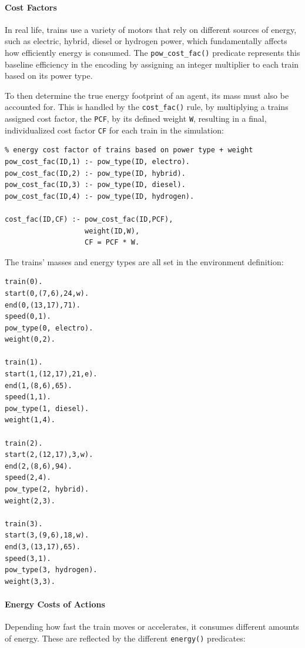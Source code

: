 \documentclass[12pt, a4paper]{llncs}
\begin{document}
\paragraph{Cost Factors}
In real life, trains use a variety of motors that rely on different sources of energy, such as electric, hybrid, diesel or hydrogen power, which fundamentally affects how efficiently energy is consumed. The \texttt{pow\_cost\_fac()} predicate represents this baseline efficiency in the encoding by assigning an integer multiplier to each train based on its power type.

To then determine the true energy footprint of an agent, its mass must also be accounted for. This is handled by the \texttt{cost\_fac()} rule, by multiplying a trains assigned cost factor, the \texttt{PCF}, by its defined weight \texttt{W}, resulting in a final, individualized cost factor \texttt{CF} for each train in the simulation:
\begin{verbatim}
% energy cost factor of trains based on power type + weight
pow_cost_fac(ID,1) :- pow_type(ID, electro).
pow_cost_fac(ID,2) :- pow_type(ID, hybrid).
pow_cost_fac(ID,3) :- pow_type(ID, diesel).
pow_cost_fac(ID,4) :- pow_type(ID, hydrogen).

cost_fac(ID,CF) :- pow_cost_fac(ID,PCF),
                   weight(ID,W),
                   CF = PCF * W.
\end{verbatim}

The trains' masses and  energy types are all set in the environment definition:
\begin{verbatim}
train(0).
start(0,(7,6),24,w).
end(0,(13,17),71).
speed(0,1).
pow_type(0, electro).
weight(0,2).

train(1).
start(1,(12,17),21,e).
end(1,(8,6),65).
speed(1,1).
pow_type(1, diesel).
weight(1,4).

train(2).
start(2,(12,17),3,w).
end(2,(8,6),94).
speed(2,4).
pow_type(2, hybrid).
weight(2,3).

train(3).
start(3,(9,6),18,w).
end(3,(13,17),65).
speed(3,1).
pow_type(3, hydrogen).
weight(3,3).
\end{verbatim}

\paragraph{Energy Costs of Actions}
Depending how fast the train moves or accelerates, it consumes different amounts of energy. These are reflected by the different \texttt{energy()} predicates:
\end{document}
